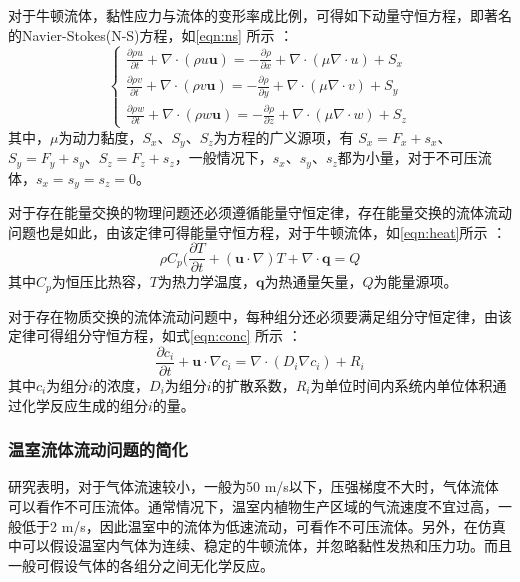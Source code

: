 对于牛顿流体，黏性应力与流体的变形率成比例，可得如下动量守恒方程，即著名的Navier-Stokes(N-S)方程，如\ref{eqn:ns} 所示\supercite{WangFujun2004} ：
	\begin{equation}
		\label{eqn:ns}
		\left\{
		\begin{aligned}
		\frac{\partial \rho u}{\partial t}+\nabla \cdot (\rho u \mathbf{u}) =- \frac{\partial \rho}{\partial x}+\nabla \cdot (\mu \nabla \cdot u ) + S_x \\
		\frac{\partial \rho v}{\partial t}+\nabla \cdot (\rho v \mathbf{u}) =- \frac{\partial \rho}{\partial y}+\nabla \cdot (\mu \nabla \cdot v ) + S_y \\
		\frac{\partial \rho w}{\partial t}+\nabla \cdot (\rho w \mathbf{u}) =- \frac{\partial \rho}{\partial z}+\nabla \cdot (\mu \nabla \cdot w ) + S_z 
		\end{aligned}
		\right.
	\end{equation}
其中，$\mu$为动力黏度，$S_x$、$S_y$、$S_z$为方程的广义源项，有 $S_x=F_x+s_x$、$S_y=F_y+s_y$、$S_z=F_z+s_z$，一般情况下，$s_x$、$s_y$、$s_z$都为小量，对于不可压流体，$s_x=s_y=s_z=0$。

对于存在能量交换的物理问题还必须遵循能量守恒定律，存在能量交换的流体流动问题也是如此，由该定律可得能量守恒方程，对于牛顿流体，如\ref{eqn:heat}所示\supercite{ComsolHeat2015,WangFujun2004} ：
	\begin{equation}
		\label{eqn:heat}
		\rho C_p (\frac{\partial T}{\partial t}+(\mathbf{u} \cdot \nabla) T + \nabla \cdot \mathbf{q}  =Q
	\end{equation}
其中$C_p$为恒压比热容，$T$为热力学温度，$\mathbf{q}$为热通量矢量，$Q$为能量源项。

对于存在物质交换的流体流动问题中，每种组分还必须要满足组分守恒定律，由该定律可得组分守恒方程，如式\ref{eqn:conc} 所示\supercite{ComsolChem2015,WangFujun2004} ：
	\begin{equation}
		\label{eqn:conc}
		\frac{\partial c_i}{\partial t}+\mathbf{u} \cdot \nabla c_i = \nabla \cdot (D_i \nabla c_i ) + R_i
	\end{equation}
其中$c_i$为组分$i$的浓度，$D_i$为组分$i$的扩散系数，$R_i$为单位时间内系统内单位体积通过化学反应生成的组分$i$的量。
		\subsubsection{温室流体流动问题的简化}
研究表明，对于气体流速较小，一般为50 m/s以下，压强梯度不大时，气体流体可以看作不可压流体。通常情况下，温室内植物生产区域的气流速度不宜过高，一般低于2 m/s，因此温室中的流体为低速流动，可看作不可压流体。另外，在仿真中可以假设温室内气体为连续、稳定的牛顿流体，并忽略黏性发热和压力功。而且一般可假设气体的各组分之间无化学反应。

